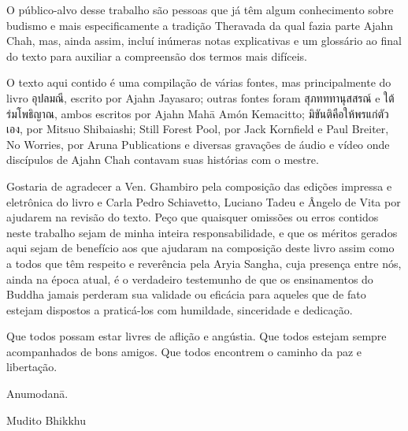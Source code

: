 O público-alvo desse trabalho são pessoas que já têm algum conhecimento
sobre budismo e mais especificamente a tradição Theravada da qual fazia
parte Ajahn Chah, mas, ainda assim, incluí inúmeras notas explicativas e
um glossário ao final do texto para auxiliar a compreensão dos termos
mais difíceis.

O texto aqui contido é uma compilação de várias fontes, mas
principalmente do livro อุปลมณี, escrito por Ajahn Jayasaro; outras
fontes foram สุภทททานุสสรณ์ e ใต้ร่มโพธิญาณ, ambos escritos por Ajahn
Mahā Amón Kemacitto; มิขันติคือให้พรแก่ตัวเอง, por Mitsuo Shibaiashi;
Still Forest Pool, por Jack Kornfield e Paul Breiter, No Worries, por
Aruna Publications e diversas gravações de áudio e vídeo onde discípulos
de Ajahn Chah contavam suas histórias com o mestre.

Gostaria de agradecer a Ven. Ghambiro pela composição das edições
impressa e eletrônica do livro e Carla Pedro Schiavetto, Luciano Tadeu e
Ângelo de Vita por ajudarem na revisão do texto. Peço que quaisquer
omissões ou erros contidos neste trabalho sejam de minha inteira
responsabilidade, e que os méritos gerados aqui sejam de benefício aos
que ajudaram na composição deste livro assim como a todos que têm
respeito e reverência pela Aryia Sangha, cuja presença entre nós, ainda
na época atual, é o verdadeiro testemunho de que os ensinamentos do
Buddha jamais perderam sua validade ou eficácia para aqueles que de fato
estejam dispostos a praticá-los com humildade, sinceridade e dedicação.

Que todos possam estar livres de aflição e angústia. Que todos estejam
sempre acompanhados de bons amigos. Que todos encontrem o caminho da paz
e libertação.

Anumodanā.

Mudito Bhikkhu
